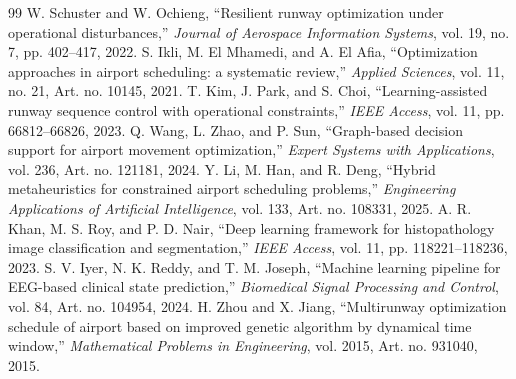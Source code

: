 \documentclass[conference]{IEEEtran}
\begin{document}
\begin{thebibliography}{99}
 W. Schuster and W. Ochieng, ``Resilient runway optimization under operational disturbances,'' \emph{Journal of Aerospace Information Systems}, vol. 19, no. 7, pp. 402--417, 2022.
 S. Ikli, M. El Mhamedi, and A. El Afia, ``Optimization approaches in airport scheduling: a systematic review,'' \emph{Applied Sciences}, vol. 11, no. 21, Art. no. 10145, 2021.
 T. Kim, J. Park, and S. Choi, ``Learning-assisted runway sequence control with operational constraints,'' \emph{IEEE Access}, vol. 11, pp. 66812--66826, 2023.
 Q. Wang, L. Zhao, and P. Sun, ``Graph-based decision support for airport movement optimization,'' \emph{Expert Systems with Applications}, vol. 236, Art. no. 121181, 2024.
 Y. Li, M. Han, and R. Deng, ``Hybrid metaheuristics for constrained airport scheduling problems,'' \emph{Engineering Applications of Artificial Intelligence}, vol. 133, Art. no. 108331, 2025.
 A. R. Khan, M. S. Roy, and P. D. Nair, ``Deep learning framework for histopathology image classification and segmentation,'' \emph{IEEE Access}, vol. 11, pp. 118221--118236, 2023.
 S. V. Iyer, N. K. Reddy, and T. M. Joseph, ``Machine learning pipeline for EEG-based clinical state prediction,'' \emph{Biomedical Signal Processing and Control}, vol. 84, Art. no. 104954, 2024.
 H. Zhou and X. Jiang, ``Multirunway optimization schedule of airport based on improved genetic algorithm by dynamical time window,'' \emph{Mathematical Problems in Engineering}, vol. 2015, Art. no. 931040, 2015.
\end{thebibliography}
\end{document}
